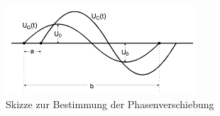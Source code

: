 \begin{figure}
  \centering
  \includegraphics[width=200pt]{data/phasenverschiebung.png}
  \caption{Skizze zur Bestimmung der Phasenverschiebung \cite{Versuchsanleitung2}}
  \label{fig:phasenverschiebung}
\end{figure}
